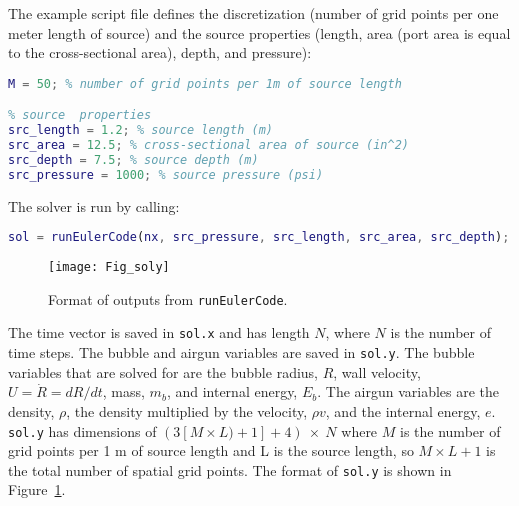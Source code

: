 \documentclass[10pt]{article}
\begin{document}
The example script file defines the discretization (number of grid points per one meter length of source) and the source properties (length, area (port area is equal to the cross-sectional area), depth, and pressure):
\begin{lstlisting}[language=Matlab]
% define discretization
M = 50; % number of grid points per 1m of source length

% source  properties
src_length = 1.2; % source length (m)
src_area = 12.5; % cross-sectional area of source (in^2)
src_depth = 7.5; % source depth (m)
src_pressure = 1000; % source pressure (psi)
\end{lstlisting}

The solver is run by calling:
\begin{lstlisting}[language=Matlab]
sol = runEulerCode(nx, src_pressure, src_length, src_area, src_depth);
\end{lstlisting}

\begin{figure}[b!]
\centering
\texttt{[image: Fig\_soly]}
\caption{Format of outputs from \texttt{runEulerCode}.}
\label{fig:sol y}
\end{figure}


The time vector is saved in \texttt{sol.x} and has length $N$, where $N$ is the number of time steps. The bubble and airgun variables are saved in \texttt{sol.y}. The bubble variables that are solved for are the bubble radius, $R$, wall velocity, $U = \dot{R} = dR/dt$, mass, $m_b$, and internal energy, $E_b$. The airgun variables are the density, $\rho$, the density multiplied by the velocity, $\rho v$, and the internal energy, $e$. \texttt{sol.y} has dimensions of $(3[M \times L)+1] + 4)~\times~N$ where $M$ is the number of grid points per 1 m of source length and L is the source length, so $M\times L+1$ is the total number of spatial grid points. The format of \texttt{sol.y} is shown in Figure~\ref{fig:sol y}.
\end{document}
